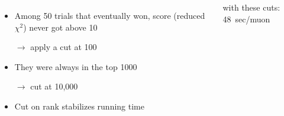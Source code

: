 \documentclass[compress]{beamer}
\begin{document}
\begin{frame}
\begin{columns}

\begin{itemize}\setlength{\itemsep}{0.2 cm}
\item Among 50 trials that eventually won, score (reduced $\chi^2$)
  never got above 10

$\longrightarrow$ apply a cut at 100

\item They were always in the top 1000

$\longrightarrow$ cut at 10,000

\item Cut on rank stabilizes running time

\end{itemize}

with these cuts: \mbox{48 sec/muon\hspace{-1 cm}}

\end{columns}

\end{frame}
\end{document}
